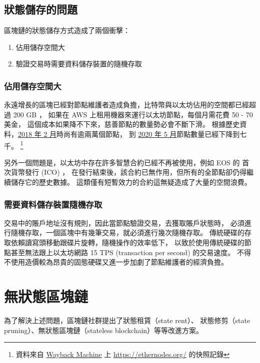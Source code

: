 \subsection{狀態儲存的問題}

區塊鏈的狀態儲存方式造成了兩個衝擊：

\begin{enumerate}
  \item 佔用儲存空間大
  \item 驗證交易時需要資料儲存裝置的隨機存取
\end{enumerate}

\subsubsection{佔用儲存空間大}

永遠增長的區塊已經對節點維護者造成負擔，比特幣與以太坊佔用的空間都已經超過 200 GB ，
如果在 AWS 上租用機器來運行以太坊節點，每個月需花費 50 - 70 美金，
這個成本如果降不下來，慈善節點的數量勢必會不斷下滑。
根據歷史資料，\href{https://web.archive.org/web/20180224224831/https://www.ethernodes.org/network/1}{2018 年 2 月}時尚有逾兩萬個節點，
到 \href{https://web.archive.org/web/20200512075927/https://www.ethernodes.org/}{2020 年 5 月}節點數量已經下降到七千。
\footnote{資料來自 \href{https://web.archive.org}{Wayback Machine} 上 \url{https://ethernodes.org/} 的快照記錄}

另外一個問題是，以太坊中存在許多智慧合約已經不再被使用，例如 EOS 的 首次貨幣發行 (ICO) ，
在發行結束後，該合約已無作用，但所有的全節點卻仍得繼續儲存它的歷史數據。
這類僅有短暫效力的合約這無疑造成了大量的空間浪費。

\subsubsection{需要資料儲存裝置隨機存取}
交易中的賬戶地址沒有規則，因此當節點驗證交易，去獲取賬戶狀態時，
必須進行隨機存取，一個區塊中有幾筆交易，就必須進行幾次隨機存取。
傳統硬碟的存取依賴讀寫頭移動跟碟片旋轉，隨機操作的效率低下，
以致於使用傳統硬碟的節點甚至無法跟上以太坊網路 15 TPS (transaction per second) 的交易速度。
不得不使用造價較為昂貴的固態硬碟又進一步加劇了節點維護者的經濟負擔。

\section{無狀態區塊鏈}
為了解決上述問題，區塊鏈社群提出了狀態租賃（state rent）、
狀態修剪（state pruning）、無狀態區塊鏈（stateless blockchain）等等改進方案。

